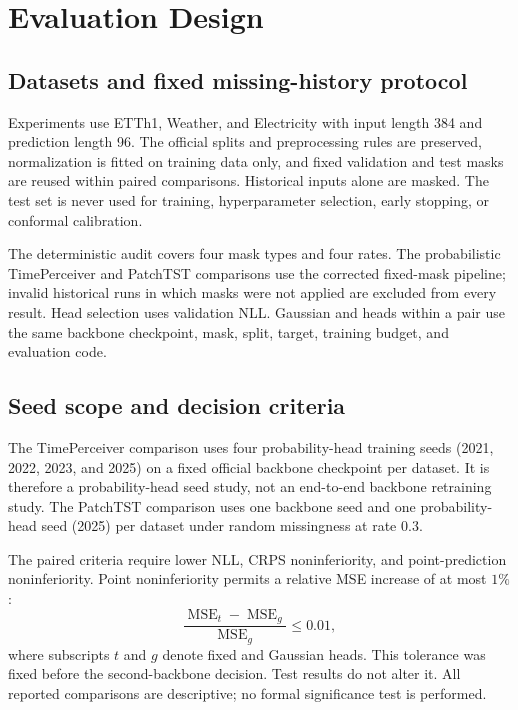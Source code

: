 \section{Evaluation Design}
\label{sec:evaluation}

\subsection{Datasets and fixed missing-history protocol}
Experiments use ETTh1, Weather, and Electricity with input length 384 and prediction length 96. The official splits and preprocessing rules are preserved, normalization is fitted on training data only, and fixed validation and test masks are reused within paired comparisons. Historical inputs alone are masked. The test set is never used for training, hyperparameter selection, early stopping, or conformal calibration.

The deterministic audit covers four mask types and four rates. The probabilistic TimePerceiver and PatchTST comparisons use the corrected fixed-mask pipeline; invalid historical runs in which masks were not applied are excluded from every result. Head selection uses validation NLL. Gaussian and \StudentT{} heads within a pair use the same backbone checkpoint, mask, split, target, training budget, and evaluation code.

\subsection{Seed scope and decision criteria}
The TimePerceiver comparison uses four probability-head training seeds (2021, 2022, 2023, and 2025) on a fixed official backbone checkpoint per dataset. It is therefore a probability-head seed study, not an end-to-end backbone retraining study. The PatchTST comparison uses one backbone seed and one probability-head seed (2025) per dataset under random missingness at rate $0.3$.

The paired criteria require lower NLL, CRPS noninferiority, and point-prediction noninferiority. Point noninferiority permits a relative MSE increase of at most $1\%$:
\begin{equation}
\frac{\operatorname{MSE}_{t}-\operatorname{MSE}_{g}}{\operatorname{MSE}_{g}}\leq 0.01,
\label{eq:point-gate}
\end{equation}
where subscripts $t$ and $g$ denote fixed \StudentT{} and Gaussian heads. This tolerance was fixed before the second-backbone decision. Test results do not alter it. All reported comparisons are descriptive; no formal significance test is performed.
